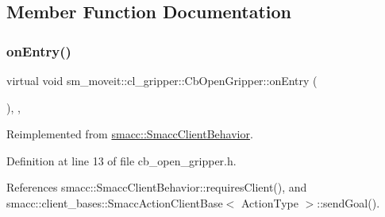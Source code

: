 \subsection{Member Function Documentation}
\mbox{\label{classsm__moveit_1_1cl__gripper_1_1CbOpenGripper_af601f6a5e2a280927a64b48100826b28}} 
\subsubsection{\texorpdfstring{on\+Entry()}{onEntry()}}
{\footnotesize\ttfamily virtual void sm\+\_\+moveit\+::cl\+\_\+gripper\+::\+Cb\+Open\+Gripper\+::on\+Entry (\begin{DoxyParamCaption}{ }\end{DoxyParamCaption})\hspace{0.3cm}{\ttfamily [inline]}, {\ttfamily [override]}, {\ttfamily [virtual]}}



Reimplemented from \hyperlink{classsmacc_1_1SmaccClientBehavior_a7962382f93987c720ad432fef55b123f}{smacc\+::\+Smacc\+Client\+Behavior}.



Definition at line 13 of file cb\+\_\+open\+\_\+gripper.\+h.



References smacc\+::\+Smacc\+Client\+Behavior\+::requires\+Client(), and smacc\+::client\+\_\+bases\+::\+Smacc\+Action\+Client\+Base$<$ Action\+Type $>$\+::send\+Goal().


